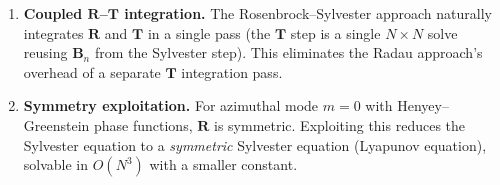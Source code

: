\documentclass[11pt,a4paper]{article}
\newcommand{\mat}[1]{\mathbf{#1}}
\theoremstyle{definition}
\begin{document}
\begin{enumerate}
\item \textbf{Coupled $\mat{R}$--$\mat{T}$ integration.}
  The Rosenbrock--Sylvester approach naturally integrates $\mat{R}$
  and $\mat{T}$ in a single pass (the $\mat{T}$ step is a single
  $N\!\times\!N$ solve reusing $\mat{B}_n$ from the Sylvester
  step).  This eliminates the Radau approach's overhead of a
  separate $\mat{T}$ integration pass.

\item \textbf{Symmetry exploitation.}
  For azimuthal mode $m=0$ with Henyey--Greenstein phase functions,
  $\mat{R}$ is symmetric.  Exploiting this reduces the Sylvester
  equation to a \emph{symmetric} Sylvester equation (Lyapunov
  equation), solvable in $O(N^3)$ with a smaller constant.
\end{enumerate}


\end{document}
